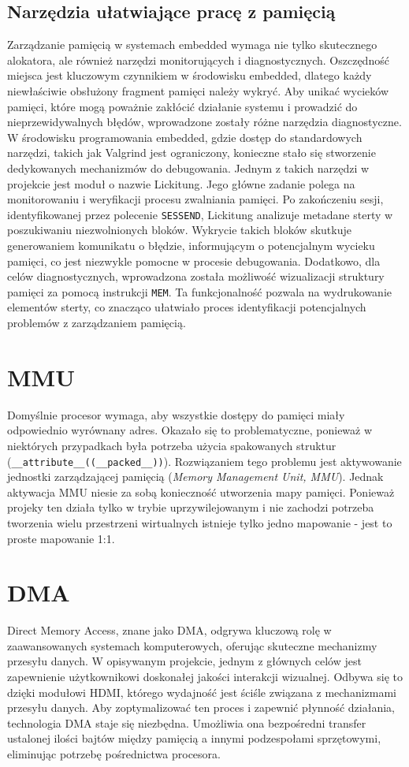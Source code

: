 \documentclass[shortabstract]{iithesis}
\begin{document}
\subsection{Narzędzia ułatwiające pracę z pamięcią}
Zarządzanie pamięcią w systemach embedded wymaga nie tylko skutecznego alokatora, ale również narzędzi monitorujących i diagnostycznych. Oszczędność miejsca jest kluczowym czynnikiem w środowisku embedded, dlatego każdy niewłaściwie obsłużony fragment pamięci należy wykryć. Aby unikać wycieków pamięci, które mogą poważnie zakłócić działanie systemu i prowadzić do nieprzewidywalnych błędów, wprowadzone zostały różne narzędzia diagnostyczne.
W środowisku programowania embedded, gdzie dostęp do standardowych narzędzi, takich jak Valgrind jest ograniczony, konieczne stało się stworzenie dedykowanych mechanizmów do debugowania. Jednym z takich narzędzi w projekcie jest moduł o nazwie Lickitung. Jego główne zadanie polega na monitorowaniu i weryfikacji procesu zwalniania pamięci. Po zakończeniu sesji, identyfikowanej przez polecenie \texttt{SESSEND}, Lickitung analizuje metadane sterty w poszukiwaniu niezwolnionych bloków. Wykrycie takich bloków skutkuje generowaniem komunikatu o błędzie, informującym o potencjalnym wycieku pamięci, co jest niezwykle pomocne w procesie debugowania.
Dodatkowo, dla celów diagnostycznych, wprowadzona została możliwość wizualizacji struktury pamięci za pomocą instrukcji \texttt{MEM}. Ta funkcjonalność pozwala na wydrukowanie elementów sterty, co znacząco ułatwiało proces identyfikacji potencjalnych problemów z zarządzaniem pamięcią.

\section{MMU}
 Domyślnie procesor wymaga, aby wszystkie dostępy do pamięci miały odpowiednio wyrównany adres. Okazało się to problematyczne, ponieważ w niektórych przypadkach była potrzeba użycia spakowanych struktur (\texttt{\_\_attribute\_\_((\_\_packed\_\_))}). Rozwiązaniem tego problemu jest aktywowanie jednostki zarządzającej pamięcią (\textit{Memory Management Unit, MMU}). Jednak aktywacja MMU niesie za sobą konieczność utworzenia mapy pamięci. Ponieważ projeky ten działa tylko w trybie uprzywilejowanym i nie zachodzi potrzeba tworzenia wielu przestrzeni wirtualnych istnieje tylko jedno mapowanie - jest to proste mapowanie 1:1.

\section{DMA}
Direct Memory Access, znane jako DMA, odgrywa kluczową rolę w zaawansowanych systemach komputerowych, oferując skuteczne mechanizmy przesyłu danych. W opisywanym projekcie, jednym z głównych celów jest zapewnienie użytkownikowi doskonałej jakości interakcji wizualnej. Odbywa się to dzięki modułowi HDMI, którego wydajność jest ściśle związana z mechanizmami przesyłu danych. Aby zoptymalizować ten proces i zapewnić płynność działania, technologia DMA staje się niezbędna. Umożliwia ona bezpośredni transfer ustalonej ilości bajtów między pamięcią a innymi podzespołami sprzętowymi, eliminując potrzebę pośrednictwa procesora.
\end{document}
